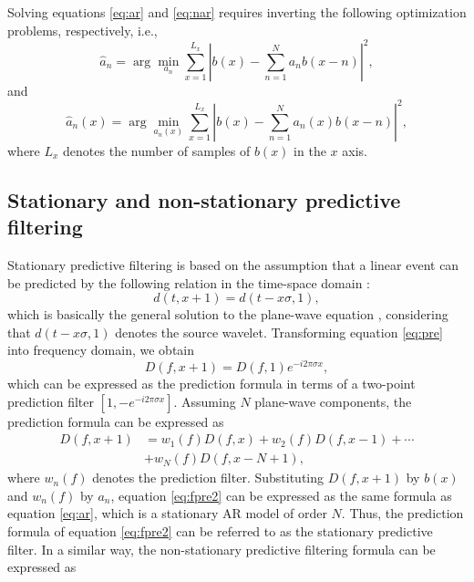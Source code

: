 Solving equations \ref{eq:ar} and \ref{eq:nar} requires inverting the following optimization problems, respectively, i.e.,
\begin{equation}
\label{eq:arinv}
\hat{a}_n = \arg \min_{a_n} \sum_{x=1}^{L_x}| b(x)-\sum_{n=1}^{N}a_nb(x-n) |^2,
\end{equation}
and 
\begin{equation}
\label{eq:narinv}
\hat{a}_n(x) = \arg \min_{a_n(x)} \sum_{x=1}^{L_x}| b(x)-\sum_{n=1}^{N}a_n(x)b(x-n) |^2,
\end{equation}
where $L_x$ denotes the number of samples of $b(x)$ in the $x$ axis.

\subsection{Stationary and non-stationary predictive filtering}
Stationary predictive filtering is based on the assumption that a linear event can be predicted by the following relation in the time-space domain \cite{yangkang20141,wanghang2021geo}:
\begin{equation}
\label{eq:pre}
d(t,x+1)=d(t-x\sigma,1),
\end{equation}
which is basically the general solution to the plane-wave equation \cite{fomel2002pwd}, considering that $d(t-x\sigma,1)$ denotes the source wavelet. 
Transforming equation \ref{eq:pre} into frequency domain, we obtain
\begin{equation}
\label{eq:fpre}
D(f,x+1)=D(f,1)e^{-i2\pi\sigma x},
\end{equation}
which can be expressed as the prediction formula in terms of a two-point prediction filter $[1,-e^{-i2\pi\sigma x}]$. Assuming $N$ plane-wave components, the prediction formula can be expressed as
\begin{equation}
\label{eq:fpre2}
\begin{split}
D(f,x+1)&=w_1(f)D(f,x)+ w_2(f)D(f,x-1) + \cdots \\
&+ w_N(f)D(f,x-N+1),
\end{split}
\end{equation}
where $w_n(f)$ denotes the prediction filter. Substituting  $D(f,x+1)$ by $b(x)$ and $w_n(f)$ by $a_n$, equation \ref{eq:fpre2} can be expressed as the same formula as equation \ref{eq:ar}, which is a stationary AR model of order $N$. Thus, the prediction formula of equation \ref{eq:fpre2} can be referred to as the stationary predictive filter. In a similar way, the non-stationary predictive filtering formula can be expressed as
